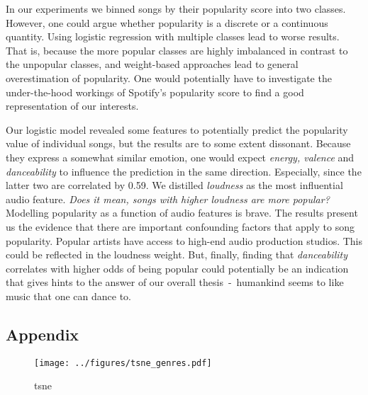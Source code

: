 \documentclass{article}
\begin{document}

In our experiments we binned songs by their popularity score into two classes. However, one could argue whether popularity is a discrete or a continuous quantity. Using logistic regression with multiple classes lead to worse results. That is, because the more popular classes are highly imbalanced in contrast to the unpopular classes, and weight-based approaches lead to general overestimation of popularity.
One would potentially have to investigate the under-the-hood workings of Spotify's popularity score to find a good representation of our interests.

Our logistic model revealed some features to potentially predict the popularity value of individual songs, but the results are to some extent dissonant. Because they express a somewhat similar emotion, one would expect \emph{energy, valence} and \emph{danceability} to influence the prediction in the same direction. Especially, since the latter two are correlated by \num{0.59}.
We distilled \emph{loudness} as the most influential audio feature. 
\emph{Does it mean, songs with higher loudness are more popular?} Modelling popularity as a function of audio features is brave. The results present us the evidence that there are important confounding factors that apply to song popularity. 
Popular artists have access to high-end audio production studios. This could be reflected in the loudness weight.
But, finally, finding that \textit{danceability} correlates with higher odds of being popular could potentially be an indication that gives hints to the answer of our overall thesis~-~humankind seems to like music that one can dance to.




\begin{appendix}
\section{Appendix}

\newpage

\begin{figure}
  \centering
  \texttt{[image: ../figures/tsne\_genres.pdf]}
  \caption{tsne}
  \label{fig:tsne_genres}
\end{figure}

\end{appendix}
\end{document}
